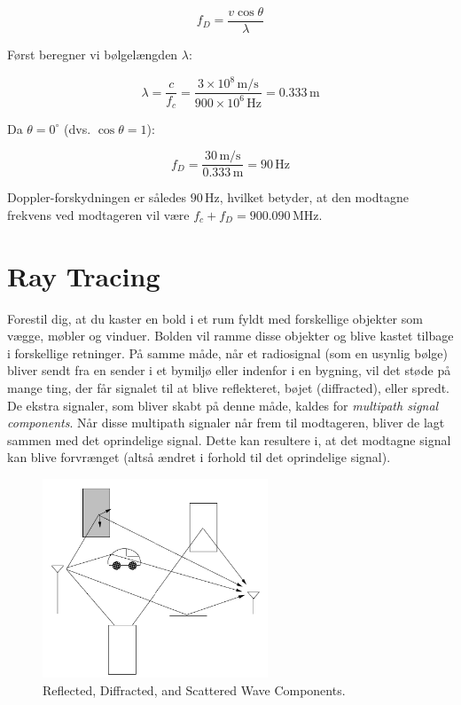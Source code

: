 \documentclass[a4paper,12pt]{book}
\begin{document}
	\[
	f_D = \frac{v \cos \theta}{\lambda}
	\]
	
	\noindent Først beregner vi bølgelængden \( \lambda \):
	
	\[
	\lambda = \frac{c}{f_c} = \frac{3 \times 10^8 \, \text{m/s}}{900 \times 10^6 \, \text{Hz}} = 0.333 \, \text{m}
	\]
	
	\noindent Da \( \theta = 0^\circ \) (dvs. \( \cos \theta = 1 \)):
	
	\[
	f_D = \frac{30 \, \text{m/s}}{0.333 \, \text{m}} = 90 \, \text{Hz}
	\]
	
	\noindent Doppler-forskydningen er således \( 90 \, \text{Hz} \), hvilket betyder, at den modtagne frekvens ved modtageren vil være \( f_c + f_D = 900.090 \, \text{MHz} \).
	
	
	\section{Ray Tracing}
	
	\noindent Forestil dig, at du kaster en bold i et rum fyldt med forskellige objekter som vægge, møbler og vinduer. Bolden vil ramme disse objekter og blive kastet tilbage i forskellige retninger. På samme måde, når et radiosignal (som en usynlig bølge) bliver sendt fra en sender i et bymiljø eller indenfor i en bygning, vil det støde på mange ting, der får signalet til at blive reflekteret, bøjet (diffracted), eller spredt. De ekstra signaler, som bliver skabt på denne måde, kaldes for \textit{multipath signal components}.
	\newline\newline\noindent
	Når disse multipath signaler når frem til modtageren, bliver de lagt sammen med det oprindelige signal. Dette kan resultere i, at det modtagne signal kan blive forvrænget (altså ændret i forhold til det oprindelige signal). 
	\begin{figure}[h]
		\centering
		\includegraphics[width=0.6\textwidth]{fig/fig3.png}
		\caption{Reflected, Diffracted, and Scattered Wave Components.}
		\label{fig:ray_tracing}
	\end{figure}
	
\end{document}
